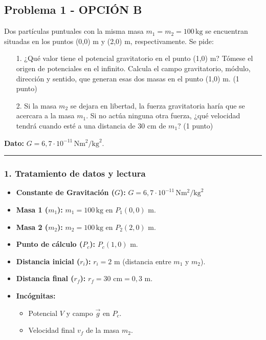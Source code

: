 \newpage

\subsection{Problema 1 - OPCIÓN B}
\label{subsec:1B_2005_sep_cv}

\begin{cajaenunciado}
Dos partículas puntuales con la misma masa $m_1=m_2=100\,\text{kg}$ se encuentran situadas en los puntos (0,0) m y (2,0) m, respectivamente. Se pide:
\begin{enumerate}
    \item[1.] ¿Qué valor tiene el potencial gravitatorio en el punto (1,0) m? Tómese el origen de potenciales en el infinito. Calcula el campo gravitatorio, módulo, dirección y sentido, que generan esas dos masas en el punto (1,0) m. (1 punto)
    \item[2.] Si la masa $m_2$ se dejara en libertad, la fuerza gravitatoria haría que se acercara a la masa $m_1$. Si no actúa ninguna otra fuerza, ¿qué velocidad tendrá cuando esté a una distancia de 30 cm de $m_1$? (1 punto)
\end{enumerate}
\textbf{Dato:} $G=6,7\cdot10^{-11}\,\text{N}\text{m}^2/\text{kg}^2$.
\end{cajaenunciado}
\hrule

\subsubsection*{1. Tratamiento de datos y lectura}
\begin{itemize}
    \item \textbf{Constante de Gravitación ($G$):} $G=6,7\cdot10^{-11}\,\text{N}\text{m}^2/\text{kg}^2$
    \item \textbf{Masa 1 ($m_1$):} $m_1 = 100 \, \text{kg}$ en $P_1(0,0)$ m.
    \item \textbf{Masa 2 ($m_2$):} $m_2 = 100 \, \text{kg}$ en $P_2(2,0)$ m.
    \item \textbf{Punto de cálculo ($P_c$):} $P_c(1,0)$ m.
    \item \textbf{Distancia inicial ($r_i$):} $r_i = 2$ m (distancia entre $m_1$ y $m_2$).
    \item \textbf{Distancia final ($r_f$):} $r_f = 30 \text{ cm} = 0,3$ m.
    \item \textbf{Incógnitas:}
    \begin{itemize}
        \item Potencial $V$ y campo $\vec{g}$ en $P_c$.
        \item Velocidad final $v_f$ de la masa $m_2$.
    \end{itemize}
\end{itemize}


